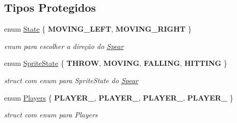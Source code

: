 \subsection*{Tipos Protegidos}
\begin{DoxyCompactItemize}
\item 
\mbox{\label{classSpear_a38f3f25555dd7c7891f373fc8479b717}} 
enum \mbox{\hyperlink{classSpear_a38f3f25555dd7c7891f373fc8479b717}{State}} \{ {\bfseries M\+O\+V\+I\+N\+G\+\_\+\+L\+E\+FT}, 
{\bfseries M\+O\+V\+I\+N\+G\+\_\+\+R\+I\+G\+HT}
 \}
\begin{DoxyCompactList}\small\item\em enum para escolher a direção do \mbox{\hyperlink{classSpear}{Spear}} \end{DoxyCompactList}\item 
\mbox{\label{classSpear_a375643d648eb52266f8d0c6f96c0a6b4}} 
enum \mbox{\hyperlink{classSpear_a375643d648eb52266f8d0c6f96c0a6b4}{Sprite\+State}} \{ {\bfseries T\+H\+R\+OW}, 
{\bfseries M\+O\+V\+I\+NG}, 
{\bfseries F\+A\+L\+L\+I\+NG}, 
{\bfseries H\+I\+T\+T\+I\+NG}
 \}
\begin{DoxyCompactList}\small\item\em struct com enum para Sprite\+State do \mbox{\hyperlink{classSpear}{Spear}} \end{DoxyCompactList}\item 
\mbox{\label{classSpear_aa85adabe13c601a31bdc124f7d75b284}} 
enum \mbox{\hyperlink{classSpear_aa85adabe13c601a31bdc124f7d75b284}{Players}} \{ {\bfseries P\+L\+A\+Y\+E\+R\+\_}, 
{\bfseries P\+L\+A\+Y\+E\+R\+\_}, 
{\bfseries P\+L\+A\+Y\+E\+R\+\_}, 
{\bfseries P\+L\+A\+Y\+E\+R\+\_}
 \}
\begin{DoxyCompactList}\small\item\em struct com enum para Players \end{DoxyCompactList}\end{DoxyCompactItemize}
